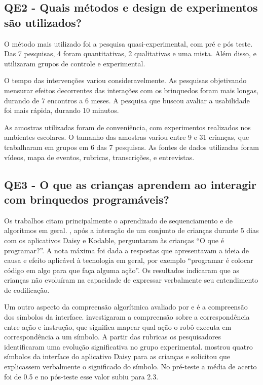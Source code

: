 {\subsection{QE2 - Quais métodos e design de experimentos são utilizados?}

O método mais utilizado foi a pesquisa quasi-experimental, com pré e pós teste. Das 7 pesquisas, 4 foram quantitativas, 2 qualitativas e uma mista. Além disso,  e  utilizaram grupos de controle e experimental.

O tempo das intervenções variou consideravelmente. As pesquisas objetivando mensurar efeitos decorrentes das interações com os brinquedos foram mais longas, durando de 7 encontros a 6 meses. A pesquisa que buscou avaliar a usabilidade foi mais rápida, durando 10 minutos.

As amostras utilizadas foram de conveniência, com experimentos realizados nos ambientes escolares. O tamanho das amostras variou entre 9 e 31 crianças, que trabalharam em grupos em 6 das 7 pesquisas. As fontes de dados utilizadas foram vídeos, mapa de eventos, rubricas, transcrições, e entrevistas.

\subsection{QE3 - O que as crianças aprendem ao interagir com brinquedos programáveis?}

Os trabalhos citam principalmente o aprendizado de sequenciamento e de algoritmos em geral. , após a interação de um conjunto de crianças durante 5 dias com os aplicativos Daisy e Kodable, perguntaram às crianças “O que é programar?”. A nota máxima foi dada a respostas que apresentavam a ideia de causa e efeito aplicável à tecnologia em geral, por exemplo “programar é colocar código em algo para que faça alguma ação”. Os resultados indicaram que as crianças não evoluíram na capacidade de expressar verbalmente seu entendimento de codificação.

Um outro aspecto da compreensão algorítmica avaliado por  e  é a compreensão dos símbolos da interface.  investigaram a compreensão sobre a correspondência entre ação e instrução, que significa mapear qual ação o robô executa em correspondência a um símbolo. A partir das rubricas os pesquisadores identificaram uma evolução significativa no grupo experimental.  mostrou quatro símbolos da interface do aplicativo Daisy para as crianças e solicitou que explicassem verbalmente o significado do símbolo. No pré-teste a média de acerto foi de 0.5 e no pós-teste esse valor subiu para 2.3.

}
